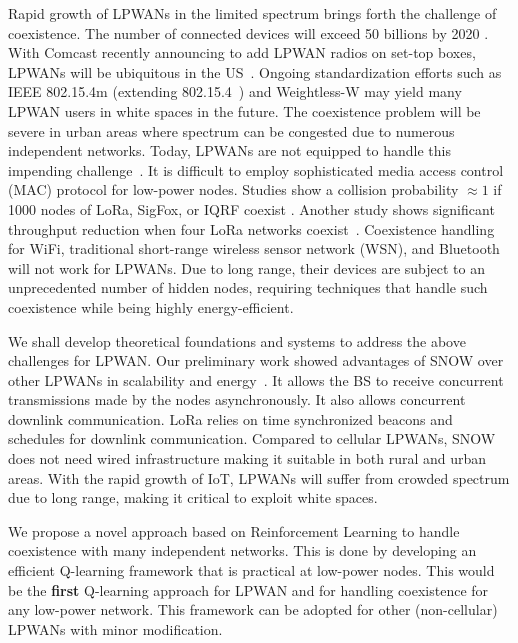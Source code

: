  
Rapid growth of LPWANs in the limited spectrum brings forth the challenge of coexistence.  
The number of connected devices will exceed 50 billions by 2020 \cite{comparativestudylpwan}. 
With Comcast recently announcing to add LPWAN radios on set-top boxes, LPWANs will be ubiquitous in the US~\cite{comcast}. 
Ongoing standardization efforts such as IEEE 802.15.4m \cite{802154m} (extending 802.15.4~\cite{ieee154}) and Weightless-W \cite{weightless} may yield many LPWAN users in white spaces in the future. The coexistence problem will be severe in urban areas where spectrum can be congested due to numerous independent  networks. Today, LPWANs are not equipped to handle this impending challenge~\cite{LPWANSurvey222}. It is difficult to employ sophisticated media access control (MAC) protocol for low-power nodes. Studies show  a collision probability $\approx 1$ if 1000 nodes of LoRa, SigFox, or IQRF coexist \cite{lp1coexistence1, lorascale}. Another study shows significant throughput reduction when four LoRa networks coexist~\cite{voigt2016mitigating}. Coexistence handling for WiFi, traditional short-range wireless sensor network (WSN), and Bluetooth~\cite{survey802154, coexistence_survey, coexistence_24} will not work for LPWANs. Due to long range, their devices are subject to an unprecedented number of hidden nodes, requiring techniques that handle such coexistence while being highly energy-efficient. 



We shall  develop theoretical foundations and systems  to address the above challenges for LPWAN.  Our preliminary work showed advantages of SNOW over other LPWANs in scalability and energy~\cite{snow, snow2, ton_snow}.  It allows the BS to receive concurrent transmissions made by the  nodes asynchronously. It also allows concurrent downlink communication. LoRa relies on time synchronized beacons and schedules for downlink communication.  Compared to cellular LPWANs, SNOW does not need wired infrastructure making it suitable in both rural and urban areas. With the rapid growth of IoT,  LPWANs will suffer from crowded spectrum due to long range, making it  critical to exploit white spaces.  


 We propose a novel approach based on Reinforcement Learning to handle coexistence with many independent networks.  This is done by developing an efficient  Q-learning framework that is practical at low-power nodes. This would be the {\bf first}  Q-learning approach for LPWAN and for handling coexistence for any low-power network. This framework can be adopted for other (non-cellular) LPWANs with minor modification.
 
 


